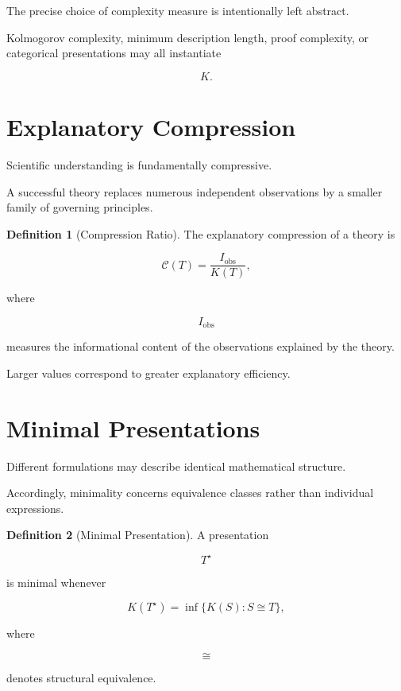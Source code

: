 \documentclass[11pt,oneside]{book}
\numberwithin{equation}{chapter}
\theoremstyle{definition}
\newtheorem{definition}{Definition}[chapter]
\theoremstyle{plain}
\begin{document}
The precise choice of complexity measure is intentionally left abstract.

Kolmogorov complexity, minimum description length, proof complexity, or
categorical presentations may all instantiate

\[
K.
\]

\section{Explanatory Compression}

Scientific understanding is fundamentally compressive.

A successful theory replaces numerous independent observations by a smaller
family of governing principles.

\begin{definition}[Compression Ratio]

The explanatory compression of a theory is

\[
\mathcal{C}(T)
=
\frac{I_{\mathrm{obs}}}
     {K(T)},
\]

where

\[
I_{\mathrm{obs}}
\]

measures the informational content of the observations explained by the
theory.

\end{definition}

Larger values correspond to greater explanatory efficiency.

\section{Minimal Presentations}

Different formulations may describe identical mathematical structure.

Accordingly, minimality concerns equivalence classes rather than individual
expressions.

\begin{definition}[Minimal Presentation]

A presentation

\[
T^\star
\]

is minimal whenever

\[
K(T^\star)
=
\inf
\{
K(S)
:
S
\cong
T
\},
\]

where

\[
\cong
\]

denotes structural equivalence.

\end{definition}
\end{document}
